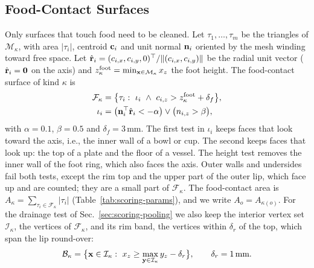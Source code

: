 \subsection{Food-Contact Surfaces}
\label{sec:scoring-food}

Only surfaces that touch food need to be cleaned.
Let $\tau_1,\dots,\tau_m$ be the triangles of $\mathcal{M}_\kappa$, with area $|\tau_i|$, centroid $\mathbf{c}_i$ and unit normal $\mathbf{n}_i$ oriented by the mesh winding toward free space.
Let $\hat{\mathbf{r}}_i=(c_{i,x},c_{i,y},0)^\top/\lVert(c_{i,x},c_{i,y})\rVert$ be the radial unit vector ($\hat{\mathbf{r}}_i=\mathbf{0}$ on the axis) and $z^{\mathrm{foot}}_\kappa=\min_{\mathbf{x}\in\mathcal{M}_\kappa}x_z$ the foot height.
The food-contact surface of kind $\kappa$ is
\begin{align}
\mathcal{F}_\kappa&=\bigl\{\tau_i:\ \iota_i\ \land\ c_{i,z}>z^{\mathrm{foot}}_\kappa+\delta_f\bigr\},\label{eq:food}\\
\iota_i&=\bigl(\vn_i^\top\hat{\vect{r}}_i<-\alpha\bigr)\lor\bigl(n_{i,z}>\beta\bigr),\nonumber
\end{align}
with $\alpha=0.1$, $\beta=0.5$ and $\delta_f=3$\,mm.
The first test in $\iota_i$ keeps faces that look toward the axis, i.e., the inner wall of a bowl or cup.
The second keeps faces that look up: the top of a plate and the floor of a vessel.
The height test removes the inner wall of the foot ring, which also faces the axis.
Outer walls and undersides fail both tests, except the rim top and the upper part of the outer lip, which face up and are counted; they are a small part of $\mathcal{F}_\kappa$.
The food-contact area is $A_\kappa=\sum_{\tau_i\in\mathcal{F}_\kappa}|\tau_i|$ (Table~\ref{tab:scoring-params}), and we write $A_o=A_{\kappa(o)}$.
For the drainage test of Sec.~\ref{sec:scoring-pooling} we also keep the interior vertex set $\mathcal{I}_\kappa$, the vertices of $\mathcal{F}_\kappa$, and its rim band, the vertices within $\delta_r$ of the top, which span the lip round-over:
\begin{equation}
\mathcal{B}_\kappa=\bigl\{\vx\in\mathcal{I}_\kappa:\ x_z\ge\max_{\vy\in\mathcal{I}_\kappa}y_z-\delta_r\bigr\},\qquad\delta_r=1\,\text{mm}.
\label{eq:rim}
\end{equation}


